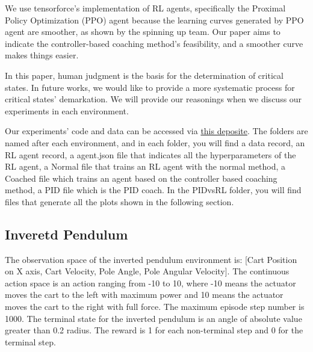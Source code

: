 \documentclass[journal]{IEEEtran}
\begin{document}
We use tensorforce's\cite{tensorforce} implementation of RL agents, specifically the Proximal Policy Optimization (PPO) agent because the learning curves generated by PPO agent are smoother, as shown by the spinning up\cite{SpinningUp2018} team. Our paper aims to indicate the controller-based coaching method's feasibility, and a smoother curve makes things easier. 

In this paper, human judgment is the basis for the determination of critical states. In future works, we would like to provide a more systematic process for critical states' demarkation. We will provide our reasonings when we discuss our experiments in each environment. 


Our experiments' code and data can be accessed via \href{https://github.com/BaiLiping/Coaching}{this deposite}. The folders are named after each environment, and in each folder, you will find a data record, an RL agent record, a agent.json file that indicates all the hyperparameters of the RL agent, a Normal file that trains an RL agent with the normal method, a Coached file which trains an agent based on the controller based coaching method, a PID file which is the PID coach. In the PIDvsRL folder, you will find files that generate all the plots shown in the following section.
\subsection{Inveretd Pendulum}
The observation space of the inverted pendulum environment is: [Cart Position on X axis, Cart Velocity, Pole Angle, Pole Angular Velocity]. The continuous action space is an action ranging from -10 to 10, where -10 means the actuator moves the cart to the left with maximum power and 10 means the actuator moves the cart to the right with full force. The maximum episode step number is 1000. The terminal state for the inverted pendulum is an angle of absolute value greater than 0.2 radius. The reward is 1 for each non-terminal step and 0 for the terminal step. 
\end{document}

